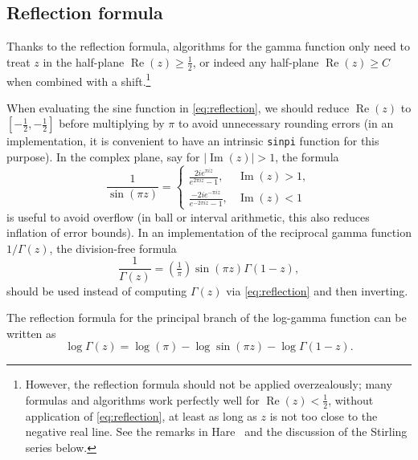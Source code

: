 \documentclass[reqno]{amsart}
\theoremstyle{definition}
\begin{document}
\subsection{Reflection formula}

Thanks to the reflection formula,
algorithms for the gamma function only need to treat $z$ in the half-plane $\operatorname{Re}(z) \ge \tfrac{1}{2}$,
or indeed any half-plane $\operatorname{Re}(z) \ge C$ when combined with
a shift.\footnote{However, the reflection formula should not be applied overzealously;
many formulas and algorithms work perfectly well for
$\operatorname{Re}(z) < \tfrac{1}{2}$,
without application of \eqref{eq:reflection},
at least as long as $z$ is not too close to the negative real line.
See the remarks in Hare~\cite{Hare1997} and the discussion of the Stirling series below.}

When evaluating the sine function in \eqref{eq:reflection}, we should
reduce $\operatorname{Re}(z)$ to $[-\tfrac{1}{2}, -\tfrac{1}{2}]$
before multiplying by $\pi$
to avoid unnecessary rounding errors
(in an implementation,
it is convenient to have an intrinsic \texttt{sinpi} function
for this purpose).
In the complex plane, say for $|\operatorname{Im}(z)| > 1$, the formula
\begin{equation}
\frac{1}{\sin(\pi z)} = 
\begin{cases}
\displaystyle{\frac{2 i e^{\pi i z}}{e^{2\pi i z} - 1}}, & \operatorname{Im}(z) > 1, \\
\displaystyle{\frac{-2 i e^{-\pi i z}}{e^{-2\pi i z} - 1}}, & \operatorname{Im}(z) < 1
\end{cases}
\end{equation}
is useful
to avoid overflow (in ball or interval arithmetic, this also reduces inflation of error bounds).
In an implementation of the reciprocal gamma function $1 / \Gamma(z)$,
the division-free formula
\begin{equation}
\frac{1}{\Gamma\!\left(z\right)} = \left(\tfrac{1}{\pi}\right) \sin\!\left(\pi z\right) \Gamma\!\left(1 - z\right),
\label{eq:reflectionrec}
\end{equation}
should be used instead of computing $\Gamma(z)$ via \eqref{eq:reflection} and then inverting.

The reflection formula for the principal branch of the log-gamma function
can be written as
\begin{equation}
\log \Gamma(z) = \log(\pi) - \log \sin(\pi z) - \log \Gamma(1-z).
\end{equation}
\end{document}
